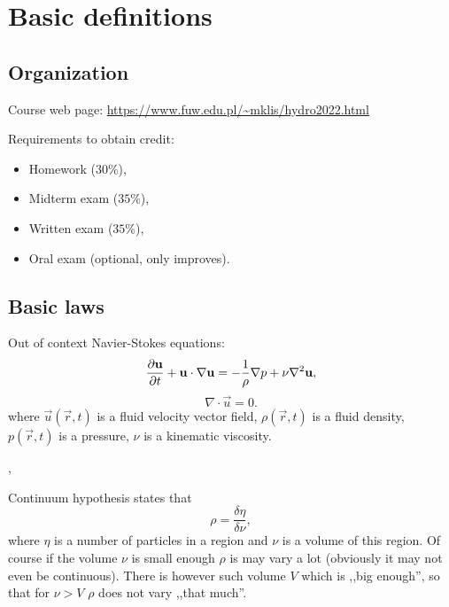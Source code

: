 \chapter{Basic definitions}


  \section{Organization}
  Course web page: \url{https://www.fuw.edu.pl/~mklis/hydro2022.html}
  

  Requirements to obtain credit:
  \begin{itemize}
    \item Homework ($30\%$),
    \item Midterm exam ($35\%$),
    \item Written exam ($35\%$),
    \item Oral exam (optional, only improves).
  \end{itemize}


  \section{Basic laws}

  \begin{example}
    Out of context Navier-Stokes equations:
    \begin{displaymath}
      \frac{\partial \mathbf{u}}{\partial t} + \mathbf{u} \cdot \nabla \mathbf{u} = - \frac{1}{\rho} \nabla p + \nu\nabla^2 \mathbf{u},
    \end{displaymath}
    \begin{displaymath}
      \nabla \cdot \vec u = 0.
    \end{displaymath}
    where $\vec u(\vec r,t)$ is a fluid velocity vector field, $\rho(\vec r,t)$ is a fluid density, 
    $p(\vec r, t)$ is a pressure, $\nu$ is a kinematic viscosity.
  \end{example}

  \sep


  Continuum hypothesis states that
  \begin{displaymath}
    \rho = \frac{\delta\eta}{\delta \nu},
  \end{displaymath}
  where $\eta$ is a number of particles in a region and $\nu$ is a volume of this region.
  Of course if the volume $\nu$ is small enough $\rho$ is may vary a lot (obviously it may not even be continuous).
  There is however such volume $V$ which is ,,big enough'', so that for $\nu > V$ $\rho$ does not vary ,,that much''.



